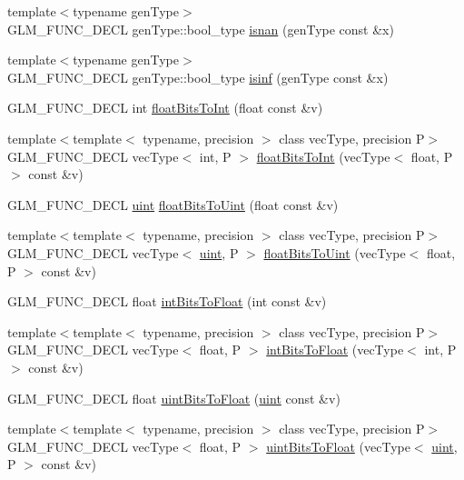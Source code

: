 \begin{CompactItemize}
\item 
{\footnotesize template$<$typename genType$>$ }\\GLM\_\-FUNC\_\-DECL genType::bool\_\-type \hyperlink{group__core__func__common_g64fb2e954341050194ba445111be01f7}{isnan} (genType const \&x)
\item 
{\footnotesize template$<$typename genType$>$ }\\GLM\_\-FUNC\_\-DECL genType::bool\_\-type \hyperlink{group__core__func__common_g9ab92804679f33124bd9575da9ac6a3a}{isinf} (genType const \&x)
\item 
GLM\_\-FUNC\_\-DECL int \hyperlink{group__core__func__common_gdc6a536a7bef046c3293d2ccad6d9ca2}{floatBitsToInt} (float const \&v)
\item 
{\footnotesize template$<$template$<$ typename, precision $>$ class vecType, precision P$>$ }\\GLM\_\-FUNC\_\-DECL vecType$<$ int, P $>$ \hyperlink{group__core__func__common_gfddf54fe5089c73ff7216e1aa9f02620}{floatBitsToInt} (vecType$<$ float, P $>$ const \&v)
\item 
GLM\_\-FUNC\_\-DECL \hyperlink{group__core__precision_g4fd29415871152bfb5abd588334147c8}{uint} \hyperlink{group__core__func__common_g748b4d2819b48d28ca09dc8733488873}{floatBitsToUint} (float const \&v)
\item 
{\footnotesize template$<$template$<$ typename, precision $>$ class vecType, precision P$>$ }\\GLM\_\-FUNC\_\-DECL vecType$<$ \hyperlink{group__core__precision_g4fd29415871152bfb5abd588334147c8}{uint}, P $>$ \hyperlink{group__core__func__common_gd25f4b1449b40ee395b05552e98d103b}{floatBitsToUint} (vecType$<$ float, P $>$ const \&v)
\item 
GLM\_\-FUNC\_\-DECL float \hyperlink{group__core__func__common_g2650dc57b2148a6ffbce20944fb4d97a}{intBitsToFloat} (int const \&v)
\item 
{\footnotesize template$<$template$<$ typename, precision $>$ class vecType, precision P$>$ }\\GLM\_\-FUNC\_\-DECL vecType$<$ float, P $>$ \hyperlink{group__core__func__common_gb3619a03062573cb024a4deed71e21dc}{intBitsToFloat} (vecType$<$ int, P $>$ const \&v)
\item 
GLM\_\-FUNC\_\-DECL float \hyperlink{group__core__func__common_g97464ca9ff4267de30ea408f700d4ca8}{uintBitsToFloat} (\hyperlink{group__core__precision_g4fd29415871152bfb5abd588334147c8}{uint} const \&v)
\item 
{\footnotesize template$<$template$<$ typename, precision $>$ class vecType, precision P$>$ }\\GLM\_\-FUNC\_\-DECL vecType$<$ float, P $>$ \hyperlink{group__core__func__common_gda31018f0dedd22004850229eb178b0d}{uintBitsToFloat} (vecType$<$ \hyperlink{group__core__precision_g4fd29415871152bfb5abd588334147c8}{uint}, P $>$ const \&v)

\end{CompactItemize}
